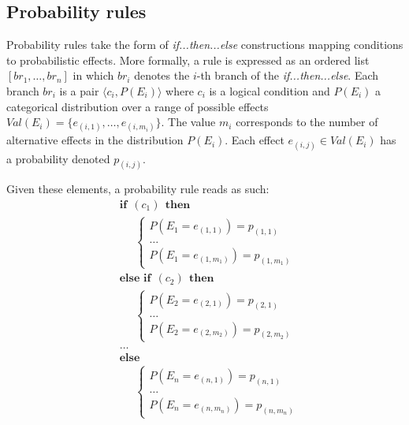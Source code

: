 \subsection{Probability rules}
\label{sec:probabirules}

Probability rules take the form of \textit{if...then...else} constructions mapping conditions to probabilistic effects. More formally, a rule is expressed as an ordered list $[ br_1, \dots, br_{n}]$ in which $br_i$ denotes the $i$-th branch of the \textit{if...then...else}. Each branch $br_i$ is a pair $\langle c_i, P(E_i) \rangle$ where $c_i$ is a logical condition and $P(E_i)$ a categorical distribution over a range of possible effects $\mathit{Val}(E_i) = \{e_{(i,1)}, \dots, e_{(i,m_i)}\}$.  The value $m_i$ corresponds to the number of alternative effects in the distribution $P(E_i)$.  Each effect $e_{(i,j)} \in \mathit{Val}(E_i)$ has a probability denoted $p_{(i,j)}$. 

Given these elements, a probability rule reads as such:
\begin{equation}
\begin{aligned}
& \textbf{if} \ \ (c_{1}) \ \ \textbf{then} \\ 
& \;\;\;\;\; \begin{cases}
P(E_1\!=\!e_{(1,1)}) = p_{(1,1)} \\
 \dots \\
P(E_1\!=\!e_{(1,m_1)}) = p_{(1,m_1)} 
\end{cases} \\[3mm]
& \textbf{else if} \ \ (c_{2}) \ \ \textbf{then} \\ 
& \;\;\;\;\; \begin{cases}
P(E_2\!=\!e_{(2,1)}) = p_{(2,1)} \\
 \dots \\
P(E_2\!=\!e_{(2,m_2)}) = p_{(2,m_2)}
\end{cases} \\ 
& \dots  \\
& \textbf{else} \\
& \;\;\;\;\; \begin{cases}
P(E_{n}\!=\!e_{(n,1)}) = p_{(n,1)} \\
\dots \\
P(E_{n}\!=\!e_{(n,m_n)}) = p_{(n,m_n)}
\end{cases}
\end{aligned}
\label{eq:probrule}
\end{equation}

